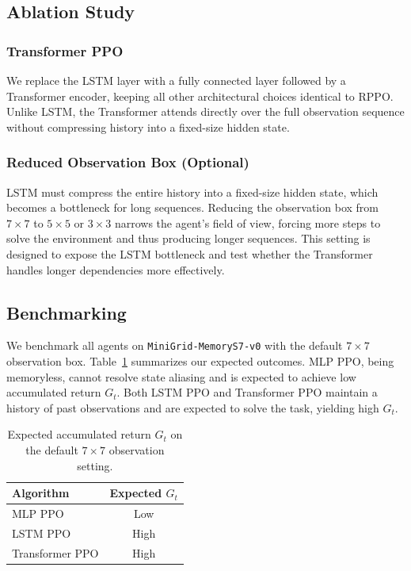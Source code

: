 \documentclass{article}
\begin{document}
\subsection{Ablation Study}

\subsubsection{Transformer PPO}

We replace the LSTM layer with a fully connected layer followed by a Transformer encoder, keeping all other architectural choices identical to RPPO. Unlike LSTM, the Transformer attends directly over the full observation sequence without compressing history into a fixed-size hidden state.

\subsubsection{Reduced Observation Box (Optional)}

LSTM must compress the entire history into a fixed-size hidden state, which becomes a bottleneck for long sequences. Reducing the observation box from $7\times7$ to $5\times5$ or $3\times3$ narrows the agent's field of view, forcing more steps to solve the environment and thus producing longer sequences. This setting is designed to expose the LSTM bottleneck and test whether the Transformer handles longer dependencies more effectively.


\subsection{Benchmarking}

We benchmark all agents on \texttt{MiniGrid-MemoryS7-v0} with the default $7\times7$ observation box. Table~\ref{tab:bench_main} summarizes our expected outcomes. MLP PPO, being memoryless, cannot resolve state aliasing and is expected to achieve low accumulated return $G_t$. Both LSTM PPO and Transformer PPO maintain a history of past observations and are expected to solve the task, yielding high $G_t$.

\begin{table}[H]
    \centering
    \caption{Expected accumulated return $G_t$ on the default $7\times7$ observation setting.}
    \label{tab:bench_main}
    \begin{tabular}{lc}
        \toprule
        \textbf{Algorithm} & \textbf{Expected $G_t$} \\
        \midrule
        MLP PPO       & Low  \\
        LSTM PPO      & High \\
        Transformer PPO & High \\
        \bottomrule
    \end{tabular}
\end{table}
\end{document}
